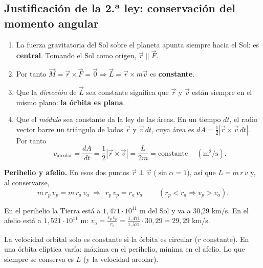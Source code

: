 \documentclass[11pt,a4paper]{article}
\begin{document}
\subsection{Justificación de la 2.ª ley: conservación del momento angular}\label{sec:areolar}
\begin{enumerate}[itemsep=3pt]
  \item La fuerza gravitatoria del Sol sobre el planeta apunta siempre hacia el Sol: es \textbf{central}. Tomando el Sol como origen, $\vec r\parallel\vec F$.
  \item Por tanto $\vec M=\vec r\times\vec F=\vec 0\Rightarrow\vec L=\vec r\times m\vec v$ es \textbf{constante}.
  \item Que la \emph{dirección} de $\vec L$ sea constante significa que $\vec r$ y $\vec v$ están siempre en el mismo plano: \textbf{la órbita es plana}.
  \item Que el \emph{módulo} sea constante da la ley de las áreas. En un tiempo $dt$, el radio vector barre un triángulo de lados $\vec r$ y $\vec v\,dt$, cuya área es $dA=\frac12|\vec r\times\vec v\,dt|$. Por tanto
  \[ \boxed{\ v_{\text{areolar}}=\frac{dA}{dt}=\frac12|\vec r\times\vec v|=\frac{L}{2m}=\text{constante}\ }\quad(\mathrm{m^2/s}). \]
\end{enumerate}

\textbf{Perihelio y afelio.} En esos dos puntos $\vec r\perp\vec v$ ($\sin\alpha=1$), así que $L=m\,r\,v$ y, al conservarse,
\[ m\,r_p\,v_p=m\,r_a\,v_a\ \Longrightarrow\ \boxed{\ r_p\,v_p=r_a\,v_a\ }\qquad(r_p<r_a\Rightarrow v_p>v_a). \]

\begin{ejemplo}[title={Ejemplo: la Tierra}]
En el perihelio la Tierra está a $1{,}471\cdot10^{11}$ m del Sol y va a 30,29 km/s. En el afelio está a $1{,}521\cdot10^{11}$ m:
$v_a=\frac{r_p\,v_p}{r_a}=\frac{1{,}471}{1{,}521}\cdot30{,}29=29{,}29$ km/s.
\end{ejemplo}

\begin{ojo}
La velocidad orbital solo es constante si la órbita es circular ($r$ constante). En una órbita elíptica varía: máxima en el perihelio, mínima en el afelio. Lo que siempre se conserva es $L$ (y la velocidad areolar).
\end{ojo}
\end{document}
